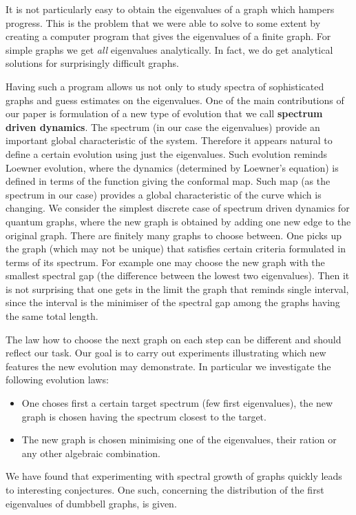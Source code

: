\documentclass[a4paper]{article}
\begin{document}
  It is not particularly easy to obtain the eigenvalues of a graph which hampers progress. This is the problem that we were able to solve to some extent by creating a computer  program that gives the eigenvalues of a finite graph. For simple graphs we get \emph{all} eigenvalues analytically. In fact, we do get analytical solutions for surprisingly difficult graphs.
 
 Having such a program allows us not only to study spectra of sophisticated graphs and guess estimates on the eigenvalues.
 One of the main contributions of our paper is formulation of a new type of evolution that 
 we call {\bf spectrum driven dynamics}. The spectrum (in our case the eigenvalues) provide an important global characteristic of the system. Therefore it appears natural to define
 a certain evolution using just the eigenvalues. Such evolution reminds  Loewner evolution, where the dynamics (determined by Loewner's equation)
 is defined in terms of the function giving the conformal map. Such map (as the spectrum in our case) provides a global characteristic of the curve which is changing.
 We consider the simplest discrete case of spectrum driven dynamics for quantum graphs, where the new graph is obtained by adding one new edge to the original
 graph. There are finitely many graphs to choose between. One picks up the graph (which may not be unique) that satisfies certain criteria formulated in terms of its 
 spectrum. For example one may choose the new graph with the smallest spectral gap (the difference between the lowest two eigenvalues). 
 Then it is not surprising that
 one gets in the limit the graph that reminds single  interval, since the interval is the minimiser of the spectral gap among the graphs having the same total length.

The law how to  choose the next graph on each step can be different and should reflect our task.  Our goal is to carry out experiments
illustrating which new features the new evolution may demonstrate. In particular we investigate the following evolution laws:
\begin{itemize}
\item One choses first a certain target spectrum (few first eigenvalues), the new graph is chosen having the spectrum closest to the target.
\item The new graph is chosen minimising one of the eigenvalues, their ration or any other algebraic combination.
\end{itemize}
 
We have found that experimenting with spectral growth of graphs quickly leads to interesting conjectures. One such, concerning the distribution of the first eigenvalues of dumbbell graphs, is given. 
\end{document}
